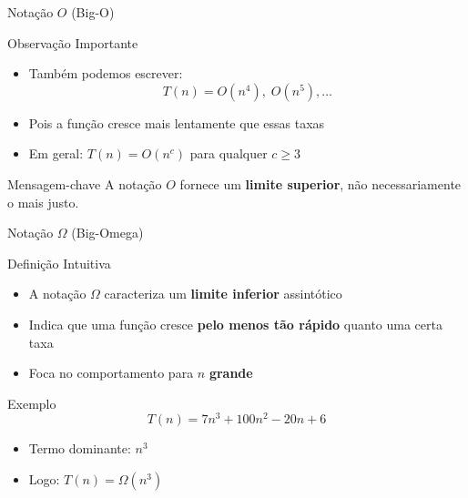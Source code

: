 \documentclass{beamer}
\begin{document}
\begin{frame}{Notação $O$ (Big-O)}

\begin{block}{Observação Importante}
\begin{itemize}
    \item Também podemos escrever:
    \[
    T(n) = O(n^4),\; O(n^5), \dots
    \]
    \item Pois a função cresce mais lentamente que essas taxas
    \item Em geral: $T(n) = O(n^c)$ para qualquer $c \geq 3$
\end{itemize}
\end{block}

\vspace{0.2cm}

\begin{alertblock}{Mensagem-chave}
A notação $O$ fornece um \textbf{limite superior}, não necessariamente o mais justo.
\end{alertblock}

\end{frame}
\begin{frame}{Notação $\Omega$ (Big-Omega)}

\begin{block}{Definição Intuitiva}
\begin{itemize}
    \item A notação $\Omega$ caracteriza um \textbf{limite inferior} assintótico
    \item Indica que uma função cresce \textbf{pelo menos tão rápido} quanto uma certa taxa
    \item Foca no comportamento para $n$ \textbf{grande}
\end{itemize}
\end{block}

\vspace{0.2cm}

\begin{block}{Exemplo}
\[
T(n) = 7n^3 + 100n^2 - 20n + 6
\]

\begin{itemize}
    \item Termo dominante: $n^3$
    \item Logo: $T(n) = \Omega(n^3)$
\end{itemize}
\end{block}

\end{frame}
\end{document}

